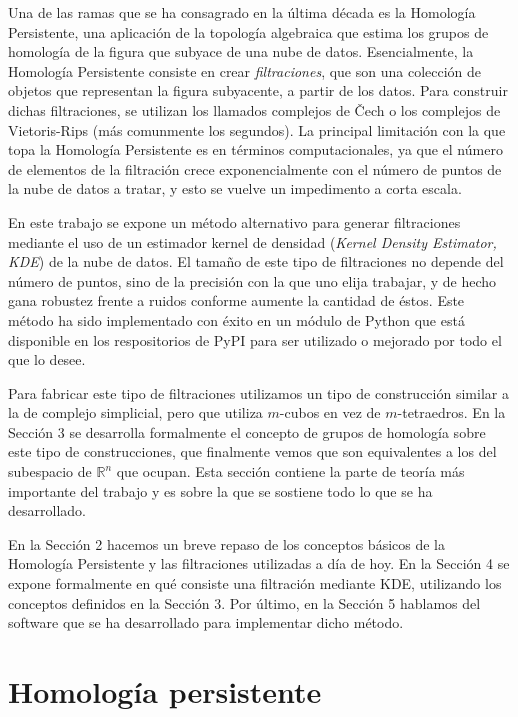 \documentclass[12pt,a4paper,twoside]{article} %
\theoremstyle{plain}
\theoremstyle{definition}
\newcommand{\R}{\mathbb{R}}
\newcommand*\NewPage{\newpage\null\thispagestyle{empty}\newpage}
\begin{document}
Una de las ramas que se ha consagrado en la última década es la Homología Persistente, una aplicación de la topología algebraica que estima los grupos de homología de la figura que subyace de una nube de datos. Esencialmente, la Homología Persistente consiste en crear \emph{filtraciones}, que son una colección de objetos que representan la figura subyacente, a partir de los datos. Para construir dichas filtraciones, se utilizan los llamados complejos de Čech o los complejos de Vietoris-Rips (más comunmente los segundos). La principal limitación con la que topa la Homología Persistente es en términos computacionales, ya que el número de elementos de la filtración crece exponencialmente con el número de puntos de la nube de datos a tratar, y esto se vuelve un impedimento a corta escala.

En este trabajo se expone un método alternativo para generar filtraciones mediante el uso de un estimador kernel de densidad (\emph{Kernel Density Estimator, KDE}) de la nube de datos. El tamaño de este tipo de filtraciones no depende del número de puntos, sino de la precisión con la que uno elija trabajar, y de hecho gana robustez frente a ruidos conforme aumente la cantidad de éstos. Este método ha sido implementado con éxito en un módulo de Python que está disponible en los respositorios de PyPI para ser utilizado o mejorado por todo el que lo desee.

Para fabricar este tipo de filtraciones utilizamos un tipo de construcción similar a la de complejo simplicial, pero que utiliza $m$-cubos en vez de $m$-tetraedros. En la Sección 3 se desarrolla formalmente el concepto de grupos de homología sobre este tipo de construcciones, que finalmente vemos que son equivalentes a los del subespacio de $\R^n$ que ocupan. Esta sección contiene la parte de teoría más importante del trabajo y es sobre la que se sostiene todo lo que se ha desarrollado.

En la Sección 2 hacemos un breve repaso de los conceptos básicos de la Homología Persistente y las filtraciones utilizadas a día de hoy. En la Sección 4 se expone formalmente en qué consiste una filtración mediante KDE, utilizando los conceptos definidos en la Sección 3. Por último, en la Sección 5 hablamos del software que se ha desarrollado para implementar dicho método.

\newpage
\NewPage
\section{Homología persistente}
\end{document}
